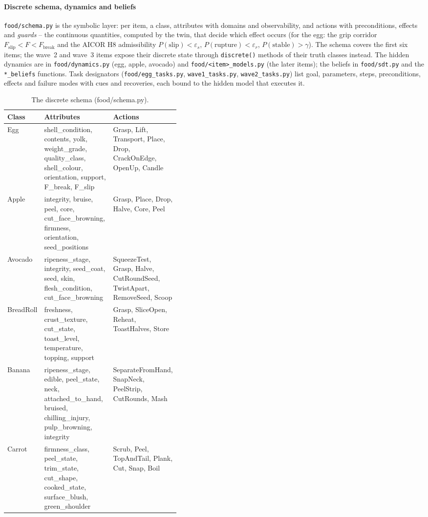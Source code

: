 \documentclass[10.5pt,a4paper]{article}
\begin{document}
\paragraph{Discrete schema, dynamics and beliefs} \texttt{food/schema.py} is the symbolic layer: per item, a
class, attributes with domains and observability, and actions with preconditions, effects and \emph{guards} -- the
continuous quantities, computed by the twin, that decide which effect occurs (for the egg: the grip corridor
$F_\mathrm{slip} < F < F_\mathrm{break}$ and the AICOR H8 admissibility $P(\mathrm{slip}) < \varepsilon_s$,
$P(\mathrm{rupture}) < \varepsilon_r$, $P(\mathrm{stable}) > \gamma$). The schema covers the first six items; the
wave~2 and wave~3 items expose their discrete state through \texttt{discrete()} methods of their truth classes
instead. The hidden dynamics are in \texttt{food/dynamics.py} (egg, apple, avocado) and \texttt{food/<item>\_models.py}
(the later items); the beliefs in \texttt{food/sdt.py} and the \texttt{*\_beliefs} functions. Task designators
(\texttt{food/egg\_tasks.py}, \texttt{wave1\_tasks.py}, \texttt{wave2\_tasks.py}) list goal, parameters, steps,
preconditions, effects and failure modes with cues and recoveries, each bound to the hidden model that executes it.
\begin{table}[htbp]\centering\scriptsize\caption{The discrete schema (food/schema.py).}
\begin{tabularx}{\linewidth}{@{}p{0.11\linewidth}Xp{0.3\linewidth}@{}}\toprule Class & Attributes & Actions \\\midrule
Egg & shell\_condition, contents, yolk, weight\_grade, quality\_class, shell\_colour, orientation, support, F\_break, F\_slip & Grasp, Lift, Transport, Place, Drop, CrackOnEdge, OpenUp, Candle \\
Apple & integrity, bruise, peel, core, cut\_face\_browning, firmness, orientation, seed\_positions & Grasp, Place, Drop, Halve, Core, Peel \\
Avocado & ripeness\_stage, integrity, seed\_coat, seed, skin, flesh\_condition, cut\_face\_browning & SqueezeTest, Grasp, Halve, CutRoundSeed, TwistApart, RemoveSeed, Scoop \\
BreadRoll & freshness, crust\_texture, cut\_state, toast\_level, temperature, topping, support & Grasp, SliceOpen, Reheat, ToastHalves, Store \\
Banana & ripeness\_stage, edible, peel\_state, neck, attached\_to\_hand, bruised, chilling\_injury, pulp\_browning, integrity & SeparateFromHand, SnapNeck, PeelStrip, CutRounds, Mash \\
Carrot & firmness\_class, peel\_state, trim\_state, cut\_shape, cooked\_state, surface\_blush, green\_shoulder & Scrub, Peel, TopAndTail, Plank, Cut, Snap, Boil \\\bottomrule\end{tabularx}\end{table}
\end{document}

